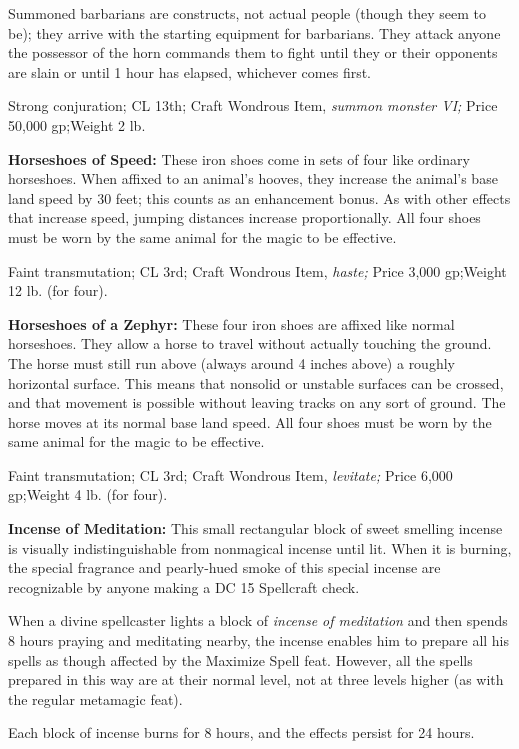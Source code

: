 \documentclass{article}
\begin{document}
Summoned barbarians are constructs, not actual people (though they seem to be); 
they arrive with the starting equipment for barbarians. They attack anyone the 
possessor of the horn commands them to fight until they or their opponents are 
slain or until 1 hour has elapsed, whichever comes first.

Strong conjuration; CL 13th; Craft Wondrous Item, \textit{summon monster VI; }Price 
50,000 gp;Weight 2 lb.

\textbf{Horseshoes of Speed:} These iron shoes come in sets of four like ordinary 
horseshoes. When affixed to an animal's hooves, they increase the animal's base 
land speed by 30 feet; this counts as an enhancement bonus. As with other effects 
that increase speed, jumping distances increase proportionally. All four shoes 
must be worn by the same animal for the magic to be effective.

Faint transmutation; CL 3rd; Craft Wondrous Item, \textit{haste; }Price 3,000 gp;Weight 
12 lb. (for four).

\textbf{Horseshoes of a Zephyr:} These four iron shoes are affixed like normal 
horseshoes. They allow a horse to travel without actually touching the ground. 
The horse must still run above (always around 4 inches above) a roughly horizontal 
surface. This means that nonsolid or unstable surfaces can be crossed, and that 
movement is possible without leaving tracks on any sort of ground. The horse moves 
at its normal base land speed. All four shoes must be worn by the same animal for 
the magic to be effective.

Faint transmutation; CL 3rd; Craft Wondrous Item, \textit{levitate; }Price 6,000 
gp;Weight 4 lb. (for four).

\textbf{Incense of Meditation: }This small rectangular block of sweet smelling 
incense is visually indistinguishable from nonmagical incense until lit. When it 
is burning, the special fragrance and pearly-hued smoke of this special incense 
are recognizable by anyone making a DC 15 Spellcraft check.

When a divine spellcaster lights a block of \textit{incense of meditation }and 
then spends 8 hours praying and meditating nearby, the incense enables him to prepare 
all his spells as though affected by the Maximize Spell feat. However, all the 
spells prepared in this way are at their normal level, not at three levels higher 
(as with the regular metamagic feat).

Each block of incense burns for 8 hours, and the effects persist for 24 hours.
\end{document}
